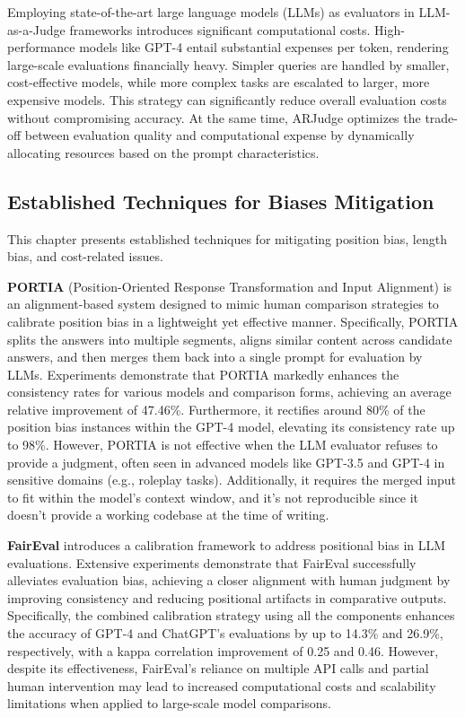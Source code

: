 \documentclass[sigconf, authoryear]{acmart}
\begin{document}
Employing state-of-the-art large language models (LLMs) as evaluators in LLM-as-a-Judge frameworks introduces significant computational costs.
High-performance models like GPT-4 entail substantial expenses per token, rendering large-scale evaluations financially heavy.
Simpler queries are handled by smaller, cost-effective models, while more complex tasks are escalated to larger, more expensive models.
This strategy can significantly reduce overall evaluation costs without compromising accuracy\cite{chen2023frugalgpt}.
At the same time, ARJudge optimizes the trade-off between evaluation quality and computational expense by dynamically allocating resources based on the prompt characteristics\cite{ar_judge}.

\subsection{Established Techniques for Biases Mitigation}\label{subsec:established-techniques-for-bias-mitigation}

This chapter presents established techniques for mitigating position bias, length bias, and cost-related issues.


\textbf{PORTIA} (Position-Oriented Response Transformation and Input Alignment) is an alignment-based system designed to mimic human comparison strategies to calibrate position bias in a lightweight yet effective manner.
Specifically, PORTIA splits the answers into multiple segments, aligns similar content across candidate answers, and then merges them back into a single prompt for evaluation by LLMs.
Experiments demonstrate that PORTIA markedly enhances the consistency rates for various models and comparison forms, achieving an average relative improvement of 47.46\%.
Furthermore, it rectifies around 80\% of the position bias instances within the GPT-4 model, elevating its consistency rate up to 98\%.
However, PORTIA is not effective when the LLM evaluator refuses to provide a judgment, often seen in advanced models like GPT-3.5 and GPT-4 in sensitive domains (e.g., roleplay tasks).
Additionally, it requires the merged input to fit within the model’s context window, and it's not reproducible since it doesn't provide a working codebase at the time of writing\cite{portia}.

\textbf{FairEval} introduces a calibration framework to address positional bias in LLM evaluations.
Extensive experiments demonstrate that FairEval successfully alleviates evaluation bias, achieving a closer alignment with human judgment by improving consistency and reducing positional artifacts in comparative outputs.
Specifically, the combined calibration strategy using all the components enhances the accuracy of GPT-4 and ChatGPT’s evaluations by up to 14.3\% and 26.9\%, respectively, with a kappa correlation improvement of 0.25 and 0.46.
However, despite its effectiveness, FairEval's reliance on multiple API calls and partial human intervention may lead to increased computational costs and scalability limitations when applied to large-scale model comparisons\cite{faireval}.
\end{document}
